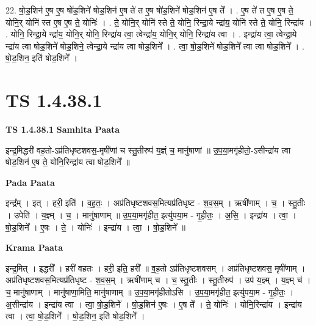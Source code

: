 \documentclass[17pt]{extarticle}
\begin{document}
22. षो॒ड॒शिन॑ ए॒ष ए॒ष षो॑ड॒शिने॑ षोड॒शिन॑ ए॒ष ते॑ त ए॒ष षो॑ड॒शिने॑ षोड॒शिन॑ ए॒ष ते᳚ । . ए॒ष ते॑ त ए॒ष ए॒ष ते॒ योनि॒र् योनि॑ स्त ए॒ष ए॒ष ते॒ योनिः॑ । . ते॒ योनि॒र् योनि॑ स्ते ते॒ योनि॒ रिन्द्रा॒ये न्द्रा॑य॒ योनि॑ स्ते ते॒ योनि॒ रिन्द्रा॑य । . योनि॒ रिन्द्रा॒ये न्द्रा॑य॒ योनि॒र् योनि॒ रिन्द्रा॑य त्वा॒ त्वेन्द्रा॑य॒ योनि॒र् योनि॒ रिन्द्रा॑य त्वा । . इन्द्रा॑य त्वा॒ त्वेन्द्रा॒ये न्द्रा॑य त्वा षोड॒शिने॑ षोड॒शिने॒ त्वेन्द्रा॒ये न्द्रा॑य त्वा षोड॒शिने᳚ । . त्वा॒ षो॒ड॒शिने॑ षोड॒शिने᳚ त्वा त्वा षोड॒शिने᳚ । . षो॒ड॒शिन॒ इति॑ षोड॒शिने᳚ । \newline
\pagebreak
{}
\section*{ TS 1.4.38.1 }

\textbf{TS 1.4.38.1 } \newline
\textbf{Samhita Paata} \newline

इन्द्र॒मिद्धरी॑ वह॒तो-ऽप्र॑तिधृष्टशवस॒-मृषी॑णां च स्तु॒तीरुप॑ य॒ज्ञ्ं च॒ मानु॑षाणां ॥ उ॒प॒या॒मगृ॑हीतो॒-ऽसीन्द्रा॑य त्वा षोड॒शिन॑ ए॒ष ते॒ योनि॒रिन्द्रा॑य त्वा षोड॒शिने᳚ ॥ \newline

\textbf{Pada Paata} \newline

इन्द्र᳚म् । इत् । हरी॒ इति॑ । व॒ह॒तः॒ । अप्र॑तिधृष्टशवस॒मित्यप्र॑तिधृष्ट - श॒व॒स॒म् । ऋषी॑णाम् । च॒ । स्तु॒तीः । उपेति॑ । य॒ज्ञ्म् । च॒ । मानु॑षाणाम् ॥ उ॒प॒या॒मगृ॑हीत॒ इत्यु॑पया॒म - गृ॒ही॒तः॒ । अ॒सि॒ । इन्द्रा॑य । त्वा॒ । षो॒ड॒शिने᳚ । ए॒षः । ते॒ । योनिः॑ । इन्द्रा॑य । त्वा॒ । षो॒ड॒शिने᳚ ॥  \newline


\textbf{Krama Paata} \newline

इन्द्र॒मित् । इद्धरी᳚ । हरी॑ वहतः । हरी॒ इति॒ हरी᳚ ॥ व॒ह॒तो ऽप्र॑तिधृष्टशवसम् । 
अप्र॑तिधृष्टशवस॒ मृषी॑णाम् । अप्र॑तिधृष्टशवस॒मित्यप्र॑तिधृष्ट - श॒व॒स॒म् । ऋषी॑णाम् च । च॒ स्तु॒तीः । स्तु॒तीरुप॑ । उप॑ य॒ज्ञ्म् । य॒ज्ञ्म् च॑ । च॒ मानु॑षाणाम् । मानु॑षाणा॒मिति॒ मानु॑षाणाम् ॥ उ॒प॒या॒मगृ॑हीतोऽसि । उ॒प॒या॒मगृ॑हीत॒ इत्यु॑पया॒म - गृ॒ही॒तः॒ । अ॒सीन्द्रा॑य । इन्द्रा॑य त्वा । त्वा॒ षो॒ड॒शिने᳚ । षो॒ड॒शिन॑ ए॒षः । ए॒ष ते᳚ । ते॒ योनिः॑ । योनि॒रिन्द्रा॑य । इन्द्रा॑य त्वा । त्वा॒ षो॒ड॒शिने᳚ । षो॒ड॒शिन॒ इति॑ षोड॒शिने᳚ । \newline
\end{document}
